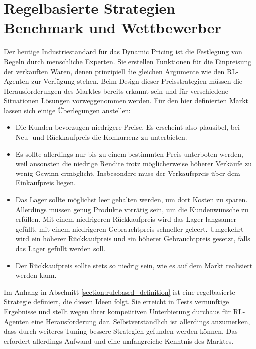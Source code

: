 \section{Regelbasierte Strategien -- Benchmark und Wettbewerber}
\label{section:rulebased}
Der heutige Industriestandard für das Dynamic Pricing ist die Festlegung von Regeln durch menschliche Experten.
Sie erstellen Funktionen für die Einpreisung der verkauften Waren, denen prinzipiell die gleichen Argumente wie den RL-Agenten zur Verfügung stehen.
Beim Design dieser Preisstrategien müssen die Herausforderungen des Marktes bereits erkannt sein und für verschiedene Situationen Lösungen vorweggenommen werden.
Für den hier definierten Markt lassen sich einige Überlegungen anstellen:
\begin{itemize}
	\item Die Kunden bevorzugen niedrigere Preise.
	Es erscheint also plausibel, bei Neu- und Rückkaufpreis die Konkurrenz zu unterbieten.
	\item Es sollte allerdings nur bis zu einem bestimmten Preis unterboten werden, weil ansonsten die niedrige Rendite trotz möglicherweise höherer Verkäufe zu wenig Gewinn ermöglicht.
	Insbesondere muss der Verkaufspreis über dem Einkaufpreis liegen.
	\item Das Lager sollte möglichst leer gehalten werden, um dort Kosten zu sparen.
	Allerdings müssen genug Produkte vorrätig sein, um die Kundenwünsche zu erfüllen.
	Mit einem niedrigeren Rückkaufpreis wird das Lager langsamer gefüllt, mit einem niedrigeren Gebrauchtpreis schneller geleert.
	Umgekehrt wird ein höherer Rückkaufpreis und ein höherer Gebrauchtpreis gesetzt, falls das Lager gefüllt werden soll.
	\item Der Rückkaufpreis sollte stets so niedrig sein, wie es auf dem Markt realisiert werden kann.
\end{itemize}
Im Anhang in Abschnitt \ref{section:rulebased_definition} ist eine regelbasierte Strategie definiert, die diesen Ideen folgt.
Sie erreicht in Tests vernünftige Ergebnisse und stellt wegen ihrer kompetitiven Unterbietung durchaus für RL-Agenten eine Herausforderung dar.
Selbstverständlich ist allerdings anzumerken, dass durch weiteres Tuning bessere Strategien gefunden werden können.
Das erfordert allerdings Aufwand und eine umfangreiche Kenntnis des Marktes.